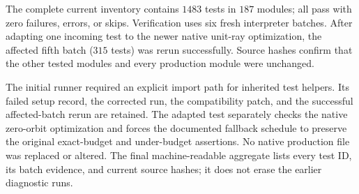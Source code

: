 The complete current inventory contains $1483$ tests in $187$ modules; all
pass with zero failures, errors, or skips. Verification uses six fresh
interpreter batches. After adapting one incoming test to the newer native
unit-ray optimization, the affected fifth batch ($315$ tests) was rerun
successfully. Source hashes confirm that the other tested modules and every
production module were unchanged.

The initial runner required an explicit import path for inherited test
helpers. Its failed setup record, the corrected run, the compatibility
patch, and the successful affected-batch rerun are retained. The adapted
test separately checks the native zero-orbit optimization and forces the
documented fallback schedule to preserve the original exact-budget and
under-budget assertions. No native production file was replaced or altered.
The final machine-readable aggregate lists every test ID, its batch evidence,
and current source hashes; it does not erase the earlier diagnostic runs.
